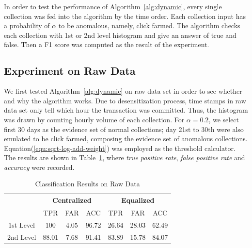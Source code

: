 \documentclass[a4paper]{IEEEtran}
\begin{document}
			In order to test the performance of Algorithm~\ref{alg:dynamic}, every single collection was fed into the algorithm by the time order. Each collection input has a probability of $\alpha$ to be anomalous, namely, click farmed. The algorithm checks each collection with 1st or 2nd level histogram and give an answer of true and false. Then a F1 score was computed as the result of the experiment.
			
		\subsection{Experiment on Raw Data}\label{sec:exp-raw}
			We first tested Algorithm~\ref{alg:dynamic} on raw data set in order to see whether and why the algorithm works. Due to desensitization process, time stamps in raw data set only tell which hour the transaction was committed. Thus, the histogram was drawn by counting hourly volume of each collection. For $\alpha = 0.2$, we select first 30 days as the evidence set of normal collections; day 21st to 30th were also emulated to be click farmed, composing the evidence set of anomalous collections. Equation(\ref{equ:sqrt-log-add-weight}) was employed as the threshold calculator. The results are shown in Table~\ref{tab:result-raw-1st}, where \textit{true positive rate}, \textit{false positive rate} and \textit{accuracy} were recorded.
			
			\begin{table}[!ht]
				\centering
				\caption{Classification Results on Raw Data}
				\label{tab:result-raw-1st}
				\begin{tabular}{|c|c|c|c|c|c|c|}
					\hline
					& \multicolumn{3}{c|}{Centralized} & \multicolumn{3}{c|}{Equalized}\\
					\hline
					& TPR & FAR & ACC & TPR & FAR & ACC\\
					\hline
					1st Level & 100 & 4.05 & 96.72 & 26.64 & 28.03 & 62.49\\
					\hline
					2nd Level & 88.01 & 7.68 & 91.41 & 83.89 & 15.78 & 84.07\\
					\hline
				\end{tabular}
			\end{table}
			
\end{document}
